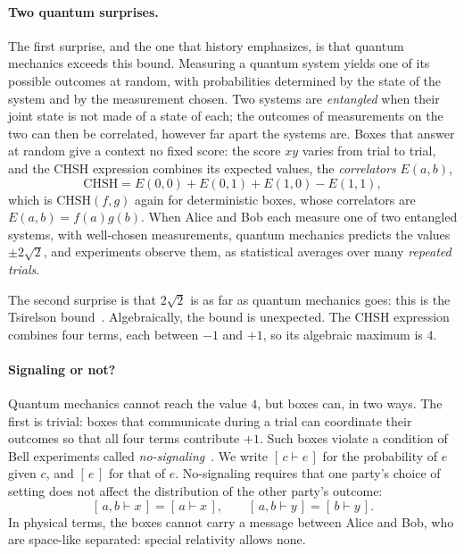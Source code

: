 \documentclass[11pt]{article}
\newcommand{\CHSH}{\mathrm{CHSH}}
\newcommand{\pr}[2]{[\,#1 \vdash #2\,]}
\newcommand{\fr}[1]{[\,#1\,]}
\begin{document}
\paragraph{Two quantum surprises.} The first surprise, and the one that history emphasizes, is that quantum mechanics exceeds this bound. Measuring a quantum system yields one of its possible outcomes at random, with probabilities determined by the state of the system and by the measurement chosen. Two systems are \emph{entangled} when their joint state is not made of a state of each; the outcomes of measurements on the two can then be correlated, however far apart the systems are. Boxes that answer at random give a context no fixed score: the score $xy$ varies from trial to trial, and the CHSH expression combines its expected values, the \emph{correlators} $E(a, b)$,
\[
  \CHSH = E(0, 0) + E(0, 1) + E(1, 0) - E(1, 1),
\]
which is $\CHSH(f, g)$ again for deterministic boxes, whose correlators are $E(a, b) = f(a)g(b)$. When Alice and Bob each measure one of two entangled systems, with well-chosen measurements, quantum mechanics predicts the values $\pm 2\sqrt2$, and experiments observe them, as statistical averages over many \emph{repeated trials}.

The second surprise is that $2\sqrt2$ is as far as quantum mechanics goes: this is the Tsirelson bound~\citep{Tsirelson1980}. Algebraically, the bound is unexpected. The CHSH expression combines four terms, each between $-1$ and $+1$, so its algebraic maximum is $4$.

\paragraph{Signaling or not?} Quantum mechanics cannot reach the value $4$, but boxes can, in two ways. The first is trivial: boxes that communicate during a trial can coordinate their outcomes so that all four terms contribute $+1$. Such boxes violate a condition of Bell experiments called \emph{no-signaling}~\citep{AbramskyBrandenburger2011,Bell1964,PopescuRohrlich1994}. We write $\pr{c}{e}$ for the probability of $e$ given $c$, and $\fr{e}$ for that of $e$. No-signaling requires that one party's choice of setting does not affect the distribution of the other party's outcome:
\begin{equation}\label{eq:ns}
  \pr{a, b}{x} = \pr{a}{x}, \qquad \pr{a, b}{y} = \pr{b}{y}.
\end{equation}
In physical terms, the boxes cannot carry a message between Alice and Bob, who are space-like separated: special relativity allows none.
\end{document}
